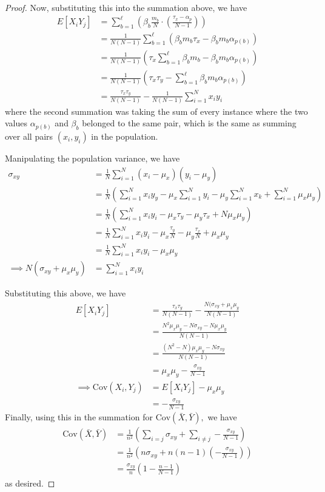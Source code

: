 \documentclass{article}
\newcommand{\cov}{\mathrm{Cov}}
\begin{document}
\begin{enumerate}
\begin{proof}
			Now, substituting this into the summation above, we have
			\begin{align*}
				E[X_iY_j] &= \sum_{b=1}^{\ell}\left( \beta_b \frac{m_b}{N}\cdot\left( \frac{\tau_x-\alpha_p}{N-1} \right) \right) \\
				&= \frac{1}{N(N-1)} \sum_{b=1}^{\ell}(\beta_b m_b \tau_x - \beta_b m_b \alpha_{p(b)}) \\
				&= \frac{1}{N(N-1)}\left( \tau_x \sum_{b=1}^{\ell}\beta_b m_b - \beta_b m_b \alpha_{p(b)}\right) \\
				&= \frac{1}{N(N-1)} \left(\tau_x\tau_y - \sum_{b=1}^{\ell}\beta_b m_b \alpha_{p(b)} \right) \\
				&= \frac{\tau_x\tau_y}{N(N-1)} - \frac{1}{N(N-1)}\sum_{i=1}^{N} x_iy_i
			\end{align*} where the second summation was taking the sum of every instance where the two values $\alpha_{p(b)}$ and $\beta_b$ belonged to the same pair, which is the same as summing over all pairs $(x_i, y_i)$ in the population.

			Manipulating the population variance, we have
			\begin{align*}
				\sigma_{xy} &= \frac{1}{N} \sum_{i=1}^{N} (x_i-\mu_x)(y_i-\mu_y) \\
				&= \frac{1}{N}\left( \sum_{i=1}^{N}x_iy_y - \mu_x\sum_{i=1}^{N} y_i - \mu_y\sum_{i=1}^{N} x_k + \sum_{i=1}^{N}\mu_x\mu_y \right) \\
				&= \frac{1}{N} \left( \sum_{i=1}^{N}x_iy_i - \mu_x\tau_y-\mu_y\tau_x+N\mu_x\mu_y \right) \\
				&= \frac{1}{N}\sum_{i=1}^{N}x_iy_i - \mu_x\frac{\tau_y}{N}-\mu_y\frac{\tau_x}{N}+\mu_x\mu_y \\
				&= \frac{1}{N}\sum_{i=1}^{N}x_iy_i - \mu_x\mu_y \\
				\implies N(\sigma_{xy}+\mu_x\mu_y)&= \sum_{i=1}^{N}x_iy_i
			\end{align*} 

			Substituting this above, we have 
			\begin{align*}
				E[X_iY_j] &= \frac{\tau_x\tau_y}{N(N-1)}-\frac{N(\sigma_{xy}+\mu_x\mu_y}{N(N-1)} \\
				&= \frac{N^2\mu_x\mu_y - N\sigma_{xy}-N\mu_x\mu_y}{N(N-1)} \\
				&= \frac{(N^2-N)\mu_x\mu_y - N\sigma_{xy}}{N(N-1)} \\
				&= \mu_x\mu_y - \frac{\sigma_{xy}}{N-1} \\
				\implies \cov(X_i, Y_j) &= E[X_iY_j]-\mu_x\mu_y \\
				&= -\frac{\sigma_{xy}}{N-1}
			\end{align*}
			Finally, using this in the summation for $\cov(\bar{X}, \bar{Y}),$ we have
			\begin{align*}
				\cov(\bar{X}, \bar{Y}) &= \frac{1}{n^2}\left( \sum_{i=j}^{}\sigma_{xy} + \sum_{i\neq j}^{}-\frac{\sigma_{xy}}{N-1}\right) \\
				&= \frac{1}{n^2}\left( n\sigma_{xy} + n(n-1)\left( -\frac{\sigma_{xy}}{N-1} \right) \right) \\
				&= \frac{\sigma_{xy}}{n}\left( 1-\frac{n-1}{N-1} \right)
			\end{align*} as desired.
			

\end{proof}
\end{enumerate}
\end{document}

